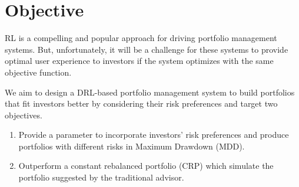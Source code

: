 \section{Objective}
\label{c:objective}
RL is a compelling and popular approach for driving portfolio management systems. But, unfortunately, it will be a challenge for these systems to provide optimal user experience to investors if the system optimizes with the same objective function.

We aim to design a DRL-based portfolio management system to build portfolios that fit investors better by considering their risk preferences and target two objectives.
\begin{enumerate}
    \item  Provide a parameter to incorporate investors' risk preferences and produce portfolios with different risks in Maximum Drawdown (MDD).
    \item Outperform a constant rebalanced portfolio (CRP) which simulate the portfolio suggested by the traditional advisor. 
\end{enumerate}

